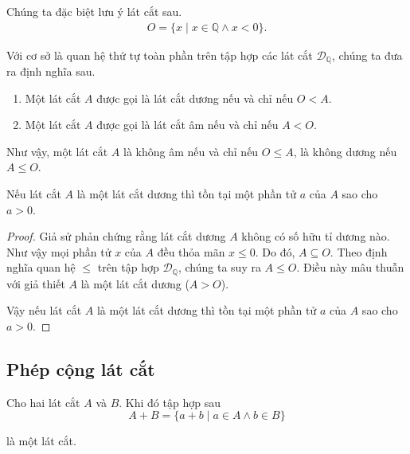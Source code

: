 Chúng ta đặc biệt lưu ý lát cắt sau.
\[
    \begin{split}
        O = \{ x \mid x\in\mathbb{Q} \wedge x < 0 \}.
    \end{split}
\]

Với cơ sở là quan hệ thứ tự toàn phần trên tập hợp các lát cắt $\mathscr{D}_{\mathbb{Q}}$, chúng ta đưa ra định nghĩa sau.
\begin{definition}
    \begin{enumerate}[label={(\roman*)}]
        \item Một lát cắt $A$ được gọi là lát cắt dương nếu và chỉ nếu $O < A$.
        \item Một lát cắt $A$ được gọi là lát cắt âm nếu và chỉ nếu $A < O$.
    \end{enumerate}
\end{definition}

Như vậy, một lát cắt $A$ là không âm nếu và chỉ nếu $O\leq A$, là không dương nếu $A\leq O$.

\begin{theorem}
    Nếu lát cắt $A$ là một lát cắt dương thì tồn tại một phần tử $a$ của $A$ sao cho $a > 0$.
\end{theorem}

\begin{proof}
    Giả sử phản chứng rằng lát cắt dương $A$ không có số hữu tỉ dương nào. Như vậy mọi phần tử $x$ của $A$ đều thỏa mãn $x\leq 0$. Do đó, $A\subseteq O$. Theo định nghĩa quan hệ $\leq$ trên tập hợp $\mathscr{D}_{\mathbb{Q}}$, chúng ta suy ra $A\leq O$. Điều này mâu thuẫn với giả thiết $A$ là một lát cắt dương ($A > O$).

    Vậy nếu lát cắt $A$ là một lát cắt dương thì tồn tại một phần tử $a$ của $A$ sao cho $a > 0$.
\end{proof}

\subsection{Phép cộng lát cắt}

\begin{theorem}
    Cho hai lát cắt $A$ và $B$. Khi đó tập hợp sau
    \[
        A + B = \{ a + b \mid a\in A\wedge b\in B \}
    \]

    là một lát cắt.
\end{theorem}

